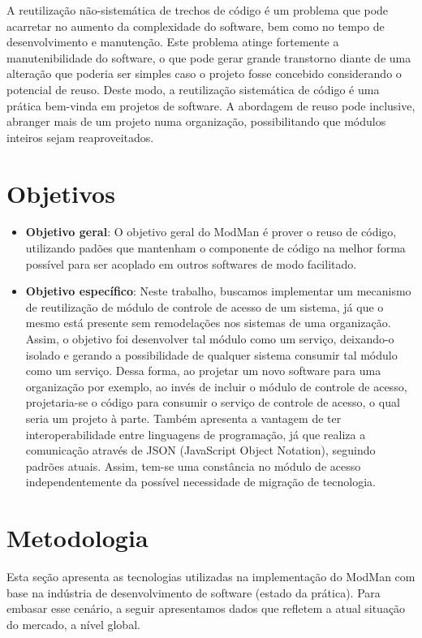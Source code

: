 A reutilização não-sistemática de trechos de código é um problema que pode acarretar no aumento da complexidade do software, bem como no tempo de desenvolvimento e manutenção. Este problema atinge fortemente a manutenibilidade do software, o que pode gerar grande transtorno diante de uma alteração que poderia ser simples caso o projeto fosse concebido considerando o potencial de reuso. Deste modo, a reutilização sistemática de código é uma prática bem-vinda em projetos de software. A abordagem de reuso pode inclusive, abranger mais de um projeto numa organização, possibilitando que módulos inteiros sejam reaproveitados. 


\section{Objetivos}\label{objetivos}


\begin{itemize}
	\item \textbf{Objetivo geral}: O objetivo geral do ModMan é prover o reuso de código, utilizando padões que mantenham o componente de código na melhor forma possível para ser acoplado em outros softwares de modo facilitado.
	\item \textbf{Objetivo específico}: Neste trabalho, buscamos implementar um mecanismo de reutilização de módulo de controle de acesso de um sistema, já que o mesmo está presente sem remodelações nos sistemas de uma organização. Assim, o objetivo foi desenvolver tal módulo como um serviço, deixando-o isolado e gerando a possibilidade de qualquer sistema consumir tal módulo como um serviço. Dessa forma, ao projetar um novo software para uma organização por exemplo, ao invés de incluir o módulo de controle de acesso, projetaria-se o código para consumir o serviço de controle de acesso, o qual seria um projeto à parte. Também apresenta a vantagem de ter interoperabilidade entre linguagens de programação, já que realiza a comunicação através de JSON (JavaScript Object Notation), seguindo padrões atuais. Assim, tem-se uma constância no módulo de acesso independentemente da possível necessidade de migração de tecnologia.
\end{itemize}


\section{Metodologia}\label{metodologia}
Esta seção apresenta as tecnologias utilizadas na implementação do ModMan com base na indústria de desenvolvimento de software (estado da prática). Para embasar esse cenário, a seguir apresentamos dados que refletem a atual situação do mercado, a nível global.


